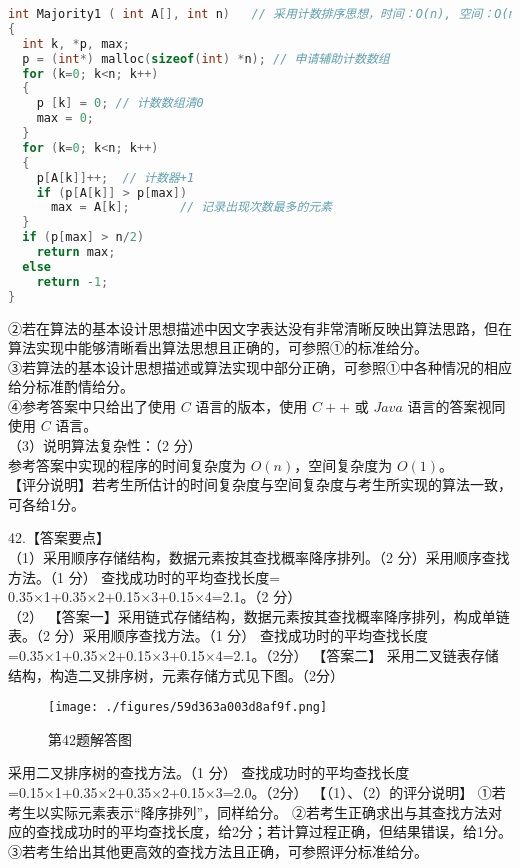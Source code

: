 \begin{lstlisting}[language=cpp]
int Majority1 ( int A[], int n)   // 采用计数排序思想，时间：O(n), 空间：O(n) 
{ 
  int k, *p, max;
  p = (int*) malloc(sizeof(int) *n); // 申请辅助计数数组
  for (k=0; k<n; k++)
  {
    p [k] = 0; // 计数数组清0
    max = 0;
  }
  for (k=0; k<n; k++)
  { 
    p[A[k]]++;  // 计数器+1
    if (p[A[k]] > p[max])
      max = A[k];       // 记录出现次数最多的元素 
  } 
  if (p[max] > n/2)
    return max;
  else
    return -1;
} 
\end{lstlisting}
②若在算法的基本设计思想描述中因文字表达没有非常清晰反映出算法思路，但在算法实现中能够清晰看出算法思想且正确的，可参照①的标准给分。 \\
③若算法的基本设计思想描述或算法实现中部分正确，可参照①中各种情况的相应给分标准酌情给分。 \\
④参考答案中只给出了使用 $C$ 语言的版本，使用 $C++$ 或 $Java$ 语言的答案视同使用 $C$ 语言。 \\
（3）说明算法复杂性：（2 分） \\
参考答案中实现的程序的时间复杂度为 $O(n)$，空间复杂度为 $O(1)$。 \\
【评分说明】若考生所估计的时间复杂度与空间复杂度与考生所实现的算法一致，可各给1分。

42.【答案要点】 \\
（1）采用顺序存储结构，数据元素按其查找概率降序排列。（2 分）采用顺序查找方法。（1 分） 
查找成功时的平均查找长度= 0.35×1+0.35×2+0.15×3+0.15×4=2.1。（2 分） \\
（2） 【答案一】采用链式存储结构，数据元素按其查找概率降序排列，构成单链表。（2 分）采用顺序查找方法。（1 分） 
查找成功时的平均查找长度=0.35×1+0.35×2+0.15×3+0.15×4=2.1。（2分） 
【答案二】 
采用二叉链表存储结构，构造二叉排序树，元素存储方式见下图。（2分）
\begin{figure}[ht]
\centering
\texttt{[image: ./figures/59d363a003d8af9f.png]}
\caption{第42题解答图} \label{fig_CSN13_13}
\end{figure}
 采用二叉排序树的查找方法。（1 分） 
查找成功时的平均查找长度=0.15×1+0.35×2+0.35×2+0.15×3=2.0。（2分）
【（1）、（2）的评分说明】 
①若考生以实际元素表示“降序排列”，同样给分。
②若考生正确求出与其查找方法对应的查找成功时的平均查找长度，给2分；若计算过程正确，但结果错误，给1分。
③若考生给出其他更高效的查找方法且正确，可参照评分标准给分。

